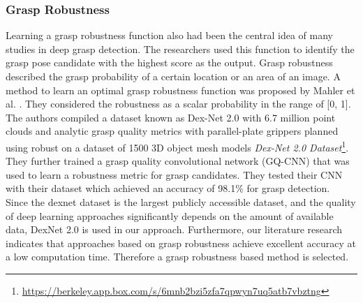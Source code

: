 \documentclass[a4paper]{article}
\begin{document}
\subsubsection{Grasp Robustness}
Learning a grasp robustness function also had been the central idea of many studies in deep grasp detection. 
The researchers used this function to identify the grasp pose candidate with the highest score as the output. 
Grasp robustness described the grasp probability of a certain location or an area of an image.
A method to learn an optimal grasp robustness function was proposed by Mahler et al. \cite{27_mahler2017dex}.
They considered the robustness as a scalar probability in the range of [0, 1]. 
The authors compiled a dataset known as Dex-Net 2.0 with 6.7 million point clouds and analytic grasp quality metrics with
parallel-plate grippers planned using robust on a dataset of 1500 3D object mesh models \textit{Dex-Net 2.0 Dataset}\footnote{\url{https://berkeley.app.box.com/s/6mnb2bzi5zfa7qpwyn7uq5atb7vbztng}}. 
They further trained a grasp quality convolutional network (GQ-CNN) that was used to learn a robustness metric for grasp candidates. They tested their CNN with their dataset which achieved an accuracy of 98.1\% for grasp detection.
\\
 
Since the dexnet dataset is the largest publicly accessible dataset, and the quality of deep learning approaches significantly depends on the amount of available data, DexNet 2.0 is used in our approach.
Furthermore, our literature research indicates that approaches based on grasp robustness achieve excellent accuracy at a low computation time. 
Therefore a grasp robustness based method is selected.
\end{document}
